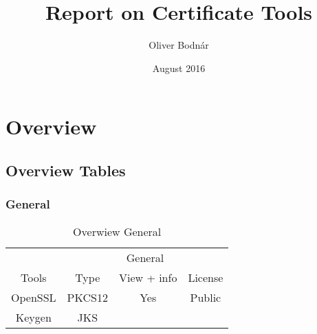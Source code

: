 \documentclass{report}
\title{Report on Certificate Tools}
\author{Oliver Bodnár}
\date{August 2016}
\begin{document}
\maketitle

\tableofcontents

\newpage

\part{Overview}

\chapter{Overview Tables}

\section{General}
\begin{table}[]
\centering
\caption{Overwiew General}
\label{my-label}
\begin{center}
\begin{tabular}{|c|c|c|c|}
\hline
                        & \multicolumn{3}{c|}{General}                   \\ \cline{2-4} 
\multirow{-2}{*}{Tools} & Type   & View + info                 & License \\ \hline
OpenSSL                 & PKCS12 & \cellcolor[HTML]{34FF34}Yes & Public  \\ \hline
Keygen                  & JKS    &                             &         \\ \hline
\end{tabular}
\end{center}
\end{table}
\end{document}
